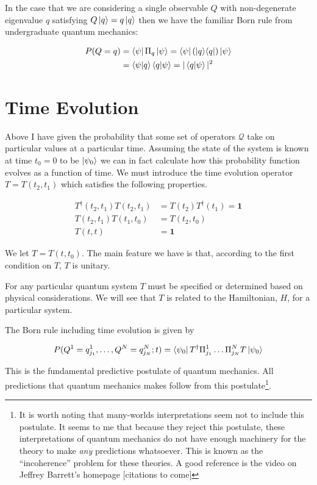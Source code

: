 \documentclass[12pt]{article}
\newcommand{\bv}[1]{\boldsymbol{#1}}
\newcommand{\ketbra}[2]{\Ket{#1}\!\Bra{#2}}
\begin{document}
In the case that we are considering a single observable $Q$ with non-degenerate eigenvalue $q$ satisfying $Q\ket{q} = q\ket{q}$ then we have the familiar Born rule from undergraduate quantum mechanics:

\begin{align}
P(Q=q) &= \bra{\psi}\Pi_q\ket{\psi} = \bra{\psi}\left(\ketbra{q}{q}\right)\ket{\psi}\\
&= \braket{\psi|q}\braket{q|\psi} = |\braket{q|\psi}|^2
\end{align}


\section{Time Evolution}


Above I have given the probability that some set of operators $\mathcal{Q}$ take on particular values at a particular time. Assuming the state of the system is known at time $t_0 = 0$ to be $\ket{\psi_0}$ we can in fact calculate how this probability function evolves as a function of time. We must introduce the time evolution operator $T = T(t_2,t_1)$ which satisfies the following properties.

\begin{align}
T^{\dag}(t_2,t_1)T(t_2,t_1) &= T(t_2)T^{\dag}(t_1) = \bv{1}\\
T(t_2,t_1)T(t_1,t_0) &= T(t_2,t_0)\\
T(t,t) & = \bv{1}
\end{align}

We let $T=T(t,t_0)$. The main feature we have is that, according to the first condition on $T$, $T$ is unitary.

 For any particular quantum system $T$ must be specified or determined based on physical considerations. We will see that $T$ is related to the Hamiltonian, $H$, for a particular system.

The Born rule including time evolution is given by

\begin{align}
P(Q^1=q^1_{j_1},\ldots,Q^N = q^N_{j_N};t) = \bra{\psi_0} T^{\dag} \Pi^1_{j_1}\ldots \Pi^N_{j_N} T \ket{\psi_0}
\end{align}

This is the fundamental predictive postulate of quantum mechanics. All predictions that quantum mechanics makes follow from this postulate\footnote{It is worth noting that many-worlds interpretations seem not to include this postulate. It seems to me that because they reject this postulate, these interpretations of quantum mechanics do not have enough machinery for the theory to make \textit{any} predictions whatsoever. This is known as the ``incoherence'' problem for these theories. A good reference is the video on Jeffrey Barrett's homepage [citations to come]}.
\end{document}
